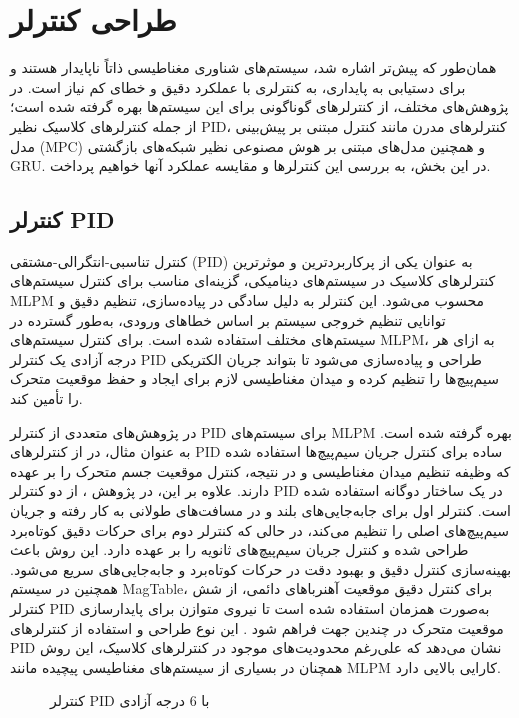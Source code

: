 \section{طراحی کنترلر}
همان‌طور که پیش‌تر اشاره شد، سیستم‌های شناوری مغناطیسی ذاتاً ناپایدار هستند و برای دستیابی به پایداری، به کنترلری با عملکرد دقیق و خطای کم نیاز است. در پژوهش‌های مختلف، از کنترلرهای گوناگونی برای این سیستم‌ها بهره گرفته شده است؛ از جمله کنترلرهای کلاسیک نظیر PID، کنترلرهای مدرن مانند کنترل مبتنی بر پیش‌بینی مدل (MPC) و همچنین مدل‌های مبتنی بر هوش مصنوعی نظیر شبکه‌های بازگشتی GRU. در این بخش، به بررسی این کنترلرها و مقایسه‌ عملکرد آنها خواهیم پرداخت.
\subsection{کنترلر PID}

کنترل تناسبی-انتگرالی-مشتقی (PID) به عنوان یکی از پرکاربردترین و موثرترین کنترلرهای کلاسیک در سیستم‌های دینامیکی، گزینه‌ای مناسب برای کنترل سیستم‌های MLPM محسوب می‌شود. این کنترلر به دلیل سادگی در پیاده‌سازی، تنظیم دقیق و توانایی تنظیم خروجی سیستم بر اساس خطاهای ورودی، به‌طور گسترده در سیستم‌های مختلف استفاده شده است. برای کنترل سیستم‌های MLPM، به ازای هر درجه آزادی یک کنترلر PID طراحی و پیاده‌سازی می‌شود تا بتواند جریان الکتریکی سیم‌پیچ‌ها را تنظیم کرده و میدان مغناطیسی لازم برای ایجاد و حفظ موقعیت متحرک را تأمین کند.

در پژوهش‌های متعددی از کنترلر PID برای سیستم‌های MLPM بهره گرفته شده است. به عنوان مثال، در 
\cite{RN39,RN24}
از کنترلرهای PID ساده برای کنترل جریان سیم‌پیچ‌ها استفاده شده که وظیفه تنظیم میدان مغناطیسی و در نتیجه، کنترل موقعیت جسم متحرک را بر عهده دارند. علاوه بر این، در پژوهش
\cite{RN32}
، از دو کنترلر PID در یک ساختار دوگانه استفاده شده است. کنترلر اول برای جابه‌جایی‌های بلند و در مسافت‌های طولانی به کار رفته و جریان سیم‌پیچ‌های اصلی را تنظیم می‌کند، در حالی که کنترلر دوم برای حرکات دقیق کوتاه‌برد طراحی شده و کنترل جریان سیم‌پیچ‌های ثانویه را بر عهده دارد. این روش باعث بهینه‌سازی کنترل دقیق و بهبود دقت در حرکات کوتاه‌برد و جابه‌جایی‌های سریع می‌شود.
همچنین در سیستم MagTable، برای کنترل دقیق موقعیت آهنرباهای دائمی، از شش کنترلر PID به‌صورت همزمان استفاده شده است تا نیروی متوازن برای پایدارسازی موقعیت متحرک در چندین جهت فراهم شود 
\cite{RN8}
. این نوع طراحی و استفاده از کنترلرهای PID نشان می‌دهد که علی‌رغم محدودیت‌های موجود در کنترلرهای کلاسیک، این روش همچنان در بسیاری از سیستم‌های مغناطیسی پیچیده مانند MLPM کارایی بالایی دارد.

\begin{figure}[ht]
\caption{کنترلر PID با 6 درجه آزادی
\cite{RN8}}
\label{fig:PID}
\end{figure}


